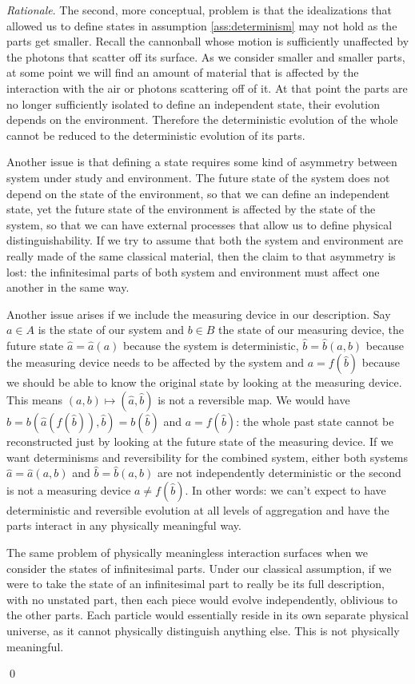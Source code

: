 \documentclass[aps,pra,10pt,twocolumn,floatfix,nofootinbib]{revtex4-1}
\numberwithin{equation}{section}
\theoremstyle{definition}
\newenvironment{rationale}{\emph{Rationale}.}{\qed}
\begin{document}
\begin{rationale}
	The second, more conceptual, problem is that the idealizations that allowed us to define states in assumption \ref{ass:determinism} may not hold as the parts get smaller. Recall the cannonball whose motion is sufficiently unaffected by the photons that scatter off its surface. As we consider smaller and smaller parts, at some point we will find an amount of material that is affected by the interaction with the air or photons scattering off of it. At that point the parts are no longer sufficiently isolated to define an independent state, their evolution depends on the environment. Therefore the deterministic evolution of the whole cannot be reduced to the deterministic evolution of its parts.
	
	Another issue is that defining a state requires some kind of asymmetry between system under study and environment. The future state of the system does not depend on the state of the environment, so that we can define an independent state, yet the future state of the environment is affected by the state of the system, so that we can have external processes that allow us to define physical distinguishability. If we try to assume that both the system and environment are really made of the same classical material, then the claim to that asymmetry is lost: the infinitesimal parts of both system and environment must affect one another in the same way.
	
	Another issue arises if we include the measuring device in our description. Say $a \in A$ is the state of our system and $b \in B$ the state of our measuring device, the future state $\hat{a}=\hat{a}(a)$ because the system is deterministic, $\hat{b}=\hat{b}(a,b)$ because the measuring device needs to be affected by the system and $a=f(\hat{b})$ because we should be able to know the original state by looking at the measuring device. This means $(a, b) \mapsto (\hat{a}, \hat{b})$ is not a reversible map. We would have $b = b(\hat{a}(f(\hat{b})), \hat{b}) = b(\hat{b})$ and $a=f(\hat{b})$: the whole past state cannot be reconstructed just by looking at the future state of the measuring device. If we want determinisms and reversibility for the combined system, either both systems $\hat{a}=\hat{a}(a, b)$ and $\hat{b}=\hat{b}(a, b)$ are not independently deterministic or the second is not a measuring device $a \neq f(\hat{b})$. In other words: we can't expect to have deterministic and reversible evolution at all levels of aggregation and have the parts interact in any physically meaningful way.
	
	The same problem of physically meaningless interaction surfaces when we consider the states of infinitesimal parts. Under our classical assumption, if we were to take the state of an infinitesimal part to really be its full description, with no unstated part, then each piece would evolve independently, oblivious to the other parts. Each particle would essentially reside in its own separate physical universe, as it cannot physically distinguish anything else. This is not physically meaningful.
	

\end{rationale}
\end{document}

